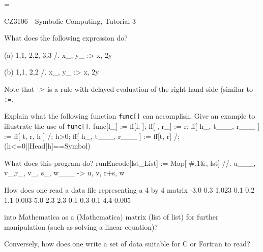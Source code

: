 \magnification=

\nopagenumbers


\centerline{\titlefont CZ3106\ \  Symbolic Computing, Tutorial 3}
\bigskip
\bigskip
{}
\bigskip
\bigskip
\bigskip


\problem What does the following expression do? 
\item{}(a) 
\ttbg
{{1,1}, {2,2}, {3,3}} /. {x_, y_} :> {x, 2y}
\tted
\item{}(b) 
\ttbg
{{1,1}, {2,2}} /. {x_, y_} :> {x, 2y}
\tted
\item{} Note that $\tt :>$ is a rule with delayed evaluation of the right-hand 
side (similar to {\tt :=}.


\bigskip
\problem  Explain what the following function {\tt func[]} can 
accomplish. Give an example to illustrate the use of {\tt func[]}.
\ttbg
func[l_] := ff[l, {}];
ff[ {}, r_] := r;
ff[ {h_, t___}, {r___} ] := ff[ {t}, {r, h} ] /; h>0;
ff[ {h_, t___}, {r___} ] := ff[{t}, {r}] /; (h<=0||Head[h]==Symbol)
\tted

\bigskip
\problem What does this program do?
\ttbg
runEncode[lst_List] :=
  Map[ {#,1}&, lst] //. 
     {u___, {v_,r_}, {v_, s_}, w___} -> {u, {v, r+s}, w}
\tted


\bigskip
\problem How does one read a data file representing a 4 by 4 matrix
 -3.0 0.3  1.023
  0.1  0.2 1.1  0.003
  5.0  2.3 2.3  0.1
  0.3  0.1 4.4  0.005
\tted
\item{} into Mathematica as a (Mathematica) matrix (list of list) for further
manipulation (such as solving a linear equation)?

\item{} Conversely, how does one write a set of data suitable for C or Fortran
to read? 

\bye
